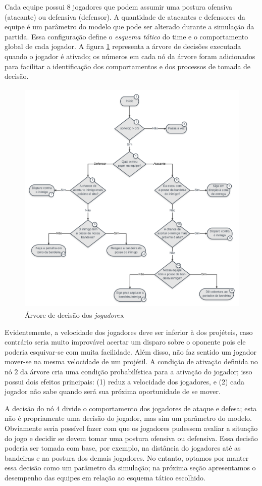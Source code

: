 \documentclass[preprint,12pt]{elsarticle}
\begin{document}
Cada equipe possui 8 jogadores que podem assumir uma postura ofensiva (atacante) ou defensiva (defensor). A quantidade de atacantes e defensores da equipe é um parâmetro do modelo que pode ser alterado durante a simulação da partida. Essa configuração define o \textit{esquema tático} do time e o comportamento global de cada jogador. A figura \ref{fig:flag-decision-tree} representa a árvore de decisões executada quando o jogador é ativado; os números em cada nó da árvore foram adicionados para facilitar a identificação dos comportamentos e dos processos de tomada de decisão.

\begin{figure}
	\centering
	\includegraphics[height=11.5cm]{figures/flag-tree.png}
	\caption{Árvore de decisão dos \textit{jogadores}.}
	\label{fig:flag-decision-tree}
\end{figure}

Evidentemente, a velocidade dos jogadores deve ser inferior à dos projéteis, caso contrário seria muito improvável acertar um disparo sobre o oponente pois ele poderia esquivar-se com muita facilidade. Além disso, não faz sentido um jogador mover-se na mesma velocidade de um projétil. A condição de ativação definida no nó $2$ da árvore cria uma condição probabilística para a ativação do jogador; isso possui dois efeitos principais: (1) reduz a velocidade dos jogadores, e (2) cada jogador não sabe quando será sua próxima oportunidade de se mover.

A decisão do nó $4$ divide o comportamento dos jogadores de ataque e defesa; esta não é propriamente uma decisão do jogador, mas sim um parâmetro do modelo. Obviamente seria possível fazer com que os jogadores pudessem avaliar a situação do jogo e decidir se devem tomar uma postura ofensiva ou defensiva. Essa decisão poderia ser tomada com base, por exemplo, na distância do jogadores até as bandeiras e na postura dos demais jogadores. No entanto, optamos por manter essa decisão como um parâmetro da simulação; na próxima seção apresentamos o desempenho das equipes em relação ao esquema tático escolhido.
\end{document}
